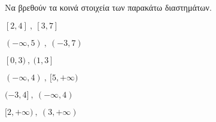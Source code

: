 Να βρεθούν τα κοινά στοιχεία των παρακάτω διαστημάτων.
\begin{multicols}{2}
\begin{alist}
\item $ [2,4]\ ,\ [3,7] $
\item $ (-\infty,5)\ ,\ (-3,7) $
\item $ [0,3)\ ,\ (1,3] $
\item $ (-\infty,4)\ ,\ [5,+\infty) $
\item $ (-3,4]\ ,\ (-\infty,4) $
\item $ [2,+\infty)\ ,\ (3,+\infty) $
\end{alist}
\end{multicols}
